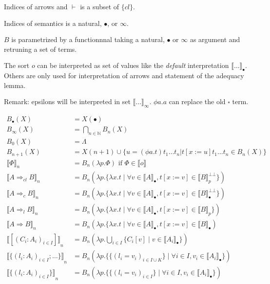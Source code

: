 \documentclass[oneside,a4]{book}
\newcommand{\N}{\mathbb{N}}
\newcommand{\sem}[1]{\ensuremath{\llbracket #1 \rrbracket}}
\begin{document}
Indices of arrows and $\vdash$ is a subset of $\{cl\}$.

Indices of semantics is a natural, $\bullet$, or $\infty$.

$B$ is parametrized by a functionnnal taking  a natural, $\bullet$
or $\infty$ as argument and retruning a set of terms.

The sort $o$ can be interpreted as set of values like the {\em default} interpretation
$\sem{\dots}_\bullet$. Others are only used for interpretation of arrows and
statement of the adequacy lemma.

Remark: epsilons will be interpreted in set $\sem{\dots}_\infty$. $\phi a.a$
can replace the old $\square$ term.

  \begin{align*}
    B_\bullet(X) &= X(\bullet)\\
    B_\infty(X)  &= \bigcap_{n \in \N} B_n(X) \\
    B_0(X) &= \Lambda     \\
    B_{n+1}(X) &= X(n+1) \cup \{ u = (\phi a.t) t_1 \dots t_n |
    t[x:=u] t_1 \dots t_n \in B_n(X)\} \\
    \sem{\Phi}_n &= B_n(\lambda p.\Phi) \text{ if } \Phi \in \sem{o}\\
    \sem{A \Rightarrow_{cl} B}_n &=
      B_n(\lambda p. \{\lambda x.t \;|\; \forall v \in \sem{A}_\bullet,
      t[x := v] \in \sem{B}_p^{\bot\bot}\})\\
    \sem{A \Rightarrow_{c} B}_n &=
      B_n(\lambda p. \{\lambda x.t \;|\; \forall v \in \sem{A}_\bullet,
      t[x := v] \in \sem{B}_\bullet^{\bot\bot}\})\\
    \sem{A \Rightarrow_{l} B}_n &=
      B_n(\lambda p. \{\lambda x.t \;|\; \forall v \in \sem{A}_\bullet,
      t[x := v] \in \sem{B}_p\})\\
    \sem{A \Rightarrow B}_n &=
      B_n(\lambda p. \{\lambda x.t \;|\; \forall v \in \sem{A}_\bullet,
       t[x := v] \in \sem{B}_\bullet)\\
    \sem{[(C_i : A_i)_{i \in I}]}_n
      &=   B_n(\lambda p. \bigcup_{i \in I} \{C_i[v] \;|\; v \in
    \sem{A_i}_\bullet \})\\
    \sem{\{(l_i : A_i)_{i \in I}; \dots\}}_n
      &= B_n(\lambda p. \{\{(l_i = v_i)_{i \in I \cup K}\} \;|\; \forall i \in I, v_i \in \sem{A_i}_\bullet\})\\
    \sem{\{(l_i : A_i)_{i \in I}\}}_n
      &= B_n(\lambda p. \{\{(l_i = v_i)_{i \in I}\} \;|\; \forall i \in I,
    v_i \in \sem{A_i}_\bullet \})\\

\end{align*}
\end{document}
